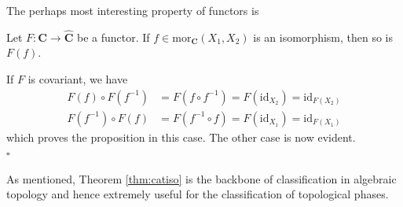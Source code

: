 The perhaps most interesting property of functors is
\\
\begin{thm}
\label{thm:catiso}
Let $F \colon \mathbf{C} \to \hat{\mathbf{C}}$ be a functor.
If $f \in \mathrm{mor}_{\mathbf{C}}(X_{1},X_{2})$ is an isomorphism, then so is $F(f)$.
\end{thm}
\begin{prf}
If $F$ is covariant, we have
\begin{align*}
  F(f)
  \circ
  F(f^{-1})
  &=
  F(f \circ f^{-1})
  =
  F(\mathrm{id}_{X_{2}})
  =
  \mathrm{id}_{F(X_{2})}
  \\
  F(f^{-1})
  \circ
  F(f)
  &=
  F(f^{-1} \circ f)
  =
  F(\mathrm{id}_{X_{1}})
  =
  \mathrm{id}_{F(X_{1})}
\end{align*}
which proves the proposition in this case.
The other case is now evident.
\\
\phantom{proven}
\hfill
$\square$
\end{prf}
As mentioned, Theorem \ref{thm:catiso} is the backbone of classification in algebraic topology and hence extremely useful for the classification of topological phases.
